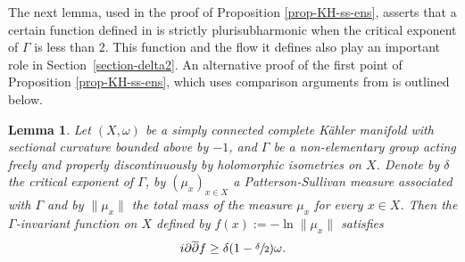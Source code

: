 \documentclass[JEP,XML,SOM,Unicode,NoEqCountersInSection,published]{cedram}
\newtheorem{lemma}[theorem]{Lemma}
\theoremstyle{definition}
\begin{document}
The next lemma, used in the proof of Proposition \ref{prop-KH-ss-ens}, asserts that a certain function defined in \cite{connellNaturalFlowCritical2023} is strictly plurisubharmonic when the critical exponent of $\Gamma$ is less than 2. This function and the flow it defines also play an important role in Section~\ref{section-delta2}. An alternative proof of the first point of Proposition \ref{prop-KH-ss-ens}, which uses comparison arguments from \cite{greeneFunctionTheoryManifolds1979} is outlined below.

\begin{lemma}\label{lem-f-unif-spsh}
Let $(X,\omega)$ be a simply connected complete Kähler manifold with sectional curvature bounded above by $-1$, and $\Gamma$ be a non-elementary group acting freely and properly discontinuously by holomorphic isometries on $X$. Denote by $\delta$ the critical exponent of $\Gamma$, by $(\mu_x)_{x\in X}$ a Patterson-Sullivan measure associated with $\Gamma$ and by $\lVert \mu_x\rVert$ the total mass of the measure $\mu_x$ for every $x\in X$. Then the $\Gamma$\nobreakdash-invariant function on $X$ defined by $f(x):=-\ln \lVert \mu_x\rVert$ satisfies
\begin{equation*}
i\partial\overline{\partial}{f} \ge \delta(1-\sfrac{\delta}{2})\omega.
\end{equation*}
\end{lemma}
\end{document}
